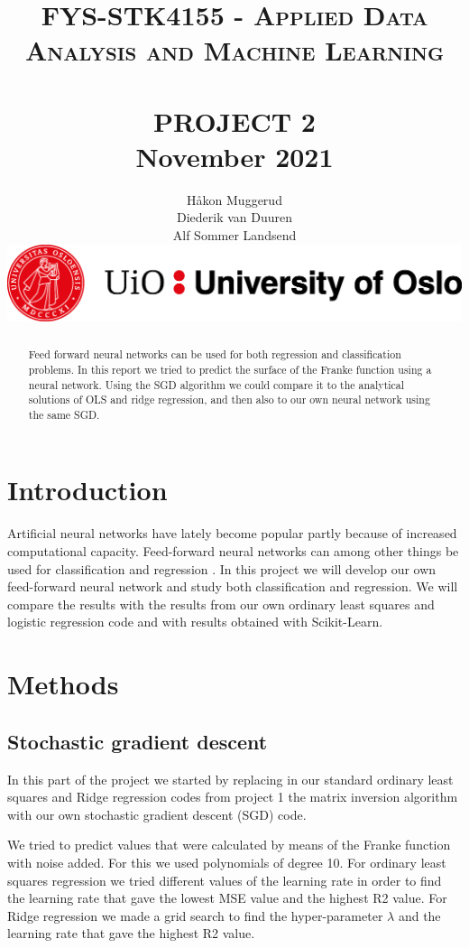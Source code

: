 \documentclass[12pt,a4paper]{article}
\title{	\normalsize \textsc{FYS-STK4155 - Applied Data Analysis and Machine Learning} 	%
		 	\\[2.0cm]								%
			\HRule{2pt} \\	[0.5cm]				%
			\LARGE \textbf{\uppercase{Project 2}}	%
			\HRule{2pt} \\ [0.5cm]		%
         \normalsize November 2021 \\
		}
\author{
		Håkon Muggerud\\
		Diederik van Duuren \\
		Alf Sommer Landsend
      \begin{center}       
         \includegraphics[width=\textwidth]{UiO.png}
      \end{center}
}
\makeatletter
\def\printtitle{%
   {\centering \@title\par}}
\def\printauthor{%
   {\centering \large \@author}}
\makeatother
\begin{document}
\thispagestyle{empty}		%

\printtitle					%
  	\vfill
\printauthor				%
\newpage

\begin{abstract}
    Feed forward neural networks can be used for both regression and classification problems. In this report we tried to predict the surface of the Franke function using a neural network. Using the SGD algorithm we could compare it to the analytical solutions of OLS and ridge regression, and then also to our own neural network using the same SGD. 
\end{abstract}
\newpage

\tableofcontents
\thispagestyle{empty}
\newpage


\section{Introduction}
Artificial neural networks have lately become popular partly because of increased computational capacity. Feed-forward neural networks can among other things be used for classification and regression \cite{jain1996}. In this project we will develop our own feed-forward neural network and study both classification and regression. We will compare the results with the results from our own ordinary least squares and logistic regression code and with results obtained with Scikit-Learn.


\section{Methods}

    \subsection{Stochastic gradient descent}

    In this part of the project we started by replacing in our standard ordinary least squares and Ridge regression codes from project 1 the matrix inversion algorithm with our own stochastic gradient descent (SGD) code.

    

    We tried to predict values that were calculated by means of the Franke function with noise added. For this we used polynomials of degree 10. For ordinary least squares regression we tried different values of the learning rate in order to find the learning rate that gave the lowest MSE value and the highest R2 value. For Ridge regression we made a grid search to find the hyper-parameter $\lambda$ and the learning rate that gave the highest R2 value.
    
\end{document}
